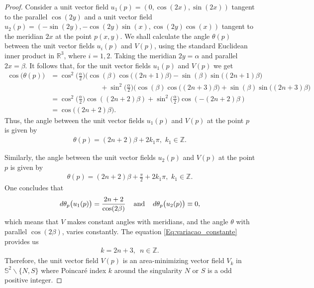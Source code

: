 \documentclass[reqno,11pt]{amsart}
\begin{document}
{\begin{proof}
\noindent Consider a unit vector field  $u_1(p) = (0, \cos(2x), \sin(2x))$ tangent to the parallel $\cos(2y)$ and a unit vector field  $u_2(p) = (-\sin(2y), -\cos(2y)\sin(x), \cos(2y)\cos(x))$ tangent to the meridian $2x$ at the point $p(x,y)$. We shall calculate the angle $\theta(p)$ between the unit vector fields $u_i(p)$ and $V(p)$, using the standard Euclidean inner product in $\mathbb{R}^3$, where $i=1,2$. Taking the meridian $2y = \alpha$ and parallel $2x = \beta$. It follows that, for the unit vector fields $u_1(p)$ and $V(p)$ we get
{\fontsize{10}{10}
\begin{align*}
    \cos\big(\theta(p)\big) &= \cos^2\bigg(\frac{\alpha}{2} \bigg) \bigg( \cos(\beta)\cos\big((2n+1)\beta\big) - \sin(\beta)\sin\big((2n+1)\beta \bigg)   \\
    & \hspace{3cm} + \sin^2\bigg(\frac{\alpha}{2} \bigg) \bigg( \cos(\beta)\cos\big((2n+3)\beta\big) + \sin(\beta)\sin\big((2n+3)\beta \bigg) \\
    & = \cos^2\bigg(\frac{\alpha}{2} \bigg) \cos((2n+2)\beta) + \sin^2\bigg(\frac{\alpha}{2} \bigg)\cos(-(2n+2)\beta)\\
    & = \cos\big((2n+2)\beta\big).
\end{align*}}
Thus, the angle between the unit vector fields $u_1(p)$ and $V(p)$ at the point $p$ is given by
\begin{eqnarray*}
    \theta(p) = (2n+2)\beta + 2k_1\pi, \, \, k_1 \in \mathbb{Z}.
 \end{eqnarray*}

\noindent Similarly, the angle between the unit vector fields $u_2(p)$ and $V(p)$ at the point $p$ is given by
\begin{eqnarray*}
    \theta(p) = (2n+2)\beta +  \frac{\pi}{2} + 2k_1\pi, \, \, k_1 \in \mathbb{Z}.
 \end{eqnarray*}
One concludes that
\begin{eqnarray*}
d\theta_p\big(u_1(p)\big) = \frac{2n+2}{\cos(2\beta)} \hspace{0.4cm}\mbox{and} \hspace{0.4cm} d\theta_p\big(u_2(p)\big) \equiv 0,
\end{eqnarray*}
which means that $V$ makes constant angles with meridians, and the angle $\theta$ with parallel $\cos(2\beta)$, varies constantly.
The equation \eqref{Eq:variacao_constante} provides us 
\begin{eqnarray*}
 k = 2n+3, \,  \, \, n \in \mathbb{Z}.
\end{eqnarray*}
Therefore, the unit vector field $V(p)$ is an area-minimizing vector field $V_k$ in $\mathbb{S}^2\backslash\{N,S\}$ where Poincaré index $k$ around the singularity $N$ or $S$ is a odd positive integer.    
\end{proof}




}
\end{document}
